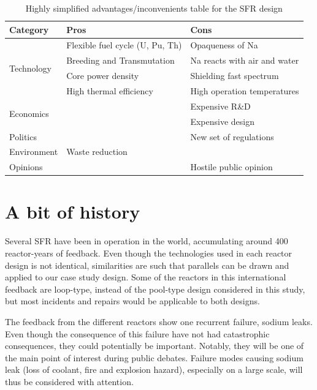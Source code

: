 \begin{table}[!htb]
    \begin{center}
        \begin{tabular}{ | l | p{5cm} | p{5cm} |}
        \hline
        Category & Pros & Cons \\ \hline
        \multirow{4}{*}{Technology} & Flexible fuel cycle (U, Pu, Th) & Opaqueness of Na \\
                                    & Breeding and Transmutation & Na reacts with air and water \\
                                    & Core power density & Shielding fast spectrum \\
                                    & High thermal efficiency & High operation temperatures \\ \hline
        \multirow{2}{*}{Economics} &  & Expensive R\&D \\
                                   &  & Expensive design \\ \hline
        Politics & & New set of regulations \\ \hline   
        Environment & Waste reduction &  \\ \hline
        Opinions & & Hostile public opinion \\
        \hline
        \end{tabular}
        \caption{Highly simplified advantages/inconvenients table for the SFR design}\label{tab:c1t1}
    \end{center}
\end{table}

\section{A bit of history}
\label{sec1:history}

Several SFR have been in operation in the world, accumulating around 400 reactor-years of feedback. Even though the technologies used in each reactor design is not identical, similarities are such that parallels can be drawn and applied to our case study design. Some of the reactors in this international feedback are loop-type, instead of the pool-type design considered in this study, but most incidents and repairs would be applicable to both designs.

The feedback from the different reactors show one recurrent failure, sodium leaks. Even though the consequence of this failure have not had catastrophic consequences, they could potentially be important. Notably, they will be one of the main point of interest during public debates. Failure modes causing sodium leak (loss of coolant, fire and explosion hazard), especially on a large scale, will thus be considered with attention.

